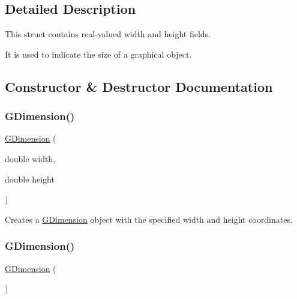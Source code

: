 \subsection{Detailed Description}
This struct contains real-\/valued width and height fields. 

It is used to indicate the size of a graphical object. 

\subsection{Constructor \& Destructor Documentation}
\mbox{\label{structsgl_1_1GDimension_a0b3f30cd49c082f8e0245af828bd9000}} 
\subsubsection{\texorpdfstring{G\+Dimension()}{GDimension()}\hspace{0.1cm}{\footnotesize\ttfamily [1/2]}}
{\footnotesize\ttfamily \mbox{\hyperlink{structsgl_1_1GDimension}{G\+Dimension}} (\begin{DoxyParamCaption}\item[{double}]{width,  }\item[{double}]{height }\end{DoxyParamCaption})}



Creates a {\ttfamily \mbox{\hyperlink{structsgl_1_1GDimension}{G\+Dimension}}} object with the specified {\ttfamily width} and {\ttfamily height} coordinates. 

\mbox{\label{structsgl_1_1GDimension_aedebfb3f99b96fb04c9f16926d11fcc5}} 
\subsubsection{\texorpdfstring{G\+Dimension()}{GDimension()}\hspace{0.1cm}{\footnotesize\ttfamily [2/2]}}
{\footnotesize\ttfamily \mbox{\hyperlink{structsgl_1_1GDimension}{G\+Dimension}} (\begin{DoxyParamCaption}{ }\end{DoxyParamCaption})}



